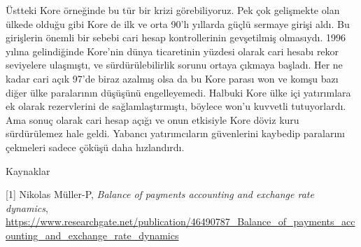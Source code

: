 \documentclass[12pt,fleqn]{article}\usepackage{../../common}
\begin{document}
Üstteki Kore örneğinde bu tür bir krizi görebiliyoruz. Pek çok gelişmekte
olan ülkede olduğu gibi Kore de ilk ve orta 90'lı yıllarda güçlü sermaye
girişi aldı. Bu girişlerin önemli bir sebebi cari hesap kontrollerinin
gevşetilmiş olmasıydı. 1996 yılına gelindiğinde Kore'nin dünya ticaretinin
yüzdesi olarak cari hesabı rekor seviyelere ulaşmıştı, ve sürdürülebilirlik
sorunu ortaya çıkmaya başladı. Her ne kadar cari açık 97'de biraz azalmış
olsa da bu Kore parası won ve komşu bazı diğer ülke paralarının düşüşünü
engelleyemedi. Halbuki Kore ülke içi yatırımlara ek olarak rezervlerini de
sağlamlaştırmıştı, böylece won'u kuvvetli tutuyorlardı. Ama sonuç olarak
cari hesap açığı ve onun etkisiyle Kore döviz kuru sürdürülemez hale
geldi. Yabancı yatırımcıların güvenlerini kaybedip paralarını çekmeleri
sadece çöküşü daha hızlandırdı.

Kaynaklar

[1] Nikolas Müller-P, {\em Balance of payments accounting and exchange rate dynamics},
    \url{https://www.researchgate.net/publication/46490787_Balance_of_payments_accounting_and_exchange_rate_dynamics}
\end{document}
